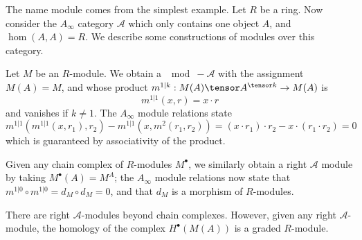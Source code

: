 
The name module comes from the simplest example. Let $R$ be a ring. Now consider the $A_\infty$ category $\mathcal A$ which only contains one object $A$, and $\hom(A, A)=R$. We describe some constructions of modules over this category.

Let $M$ be an $R$-module. We obtain a $\mod-\mathcal A$ with the assignment $M(A)=M$,  and whose product $m^{1|k}:M(A)\tensor A^{\tensor k}\to M(A)$ is 
\[
    m^{1|1}(x,r)=x\cdot r
\]
and vanishes if $k\neq 1$. The $A_\infty$ module relations state 
\[m^{1|1}(m^{1|1}(x, r_1),r_2)-m^{1|1}(x, m^2(r_1, r_2))=(x\cdot r_1)\cdot r_2 - x\cdot (r_1\cdot r_2)=0\]
which is guaranteed by associativity of the product. 

Given any chain complex of $R$-modules $M^\bullet$, we similarly obtain a right $\mathcal A$ module by taking $M^\bullet(A)=M^A$; the $A_\infty$ module relations now state that $m^{1|0}\circ m^{1|0}= d_M\circ d_M=0$, and that $d_M$ is a morphism of $R$-modules.

There are right $\mathcal A$-modules beyond chain complexes. However, given any right $\mathcal A$-module, the homology of the complex $H^\bullet(M(A))$ is a graded $R$-module.